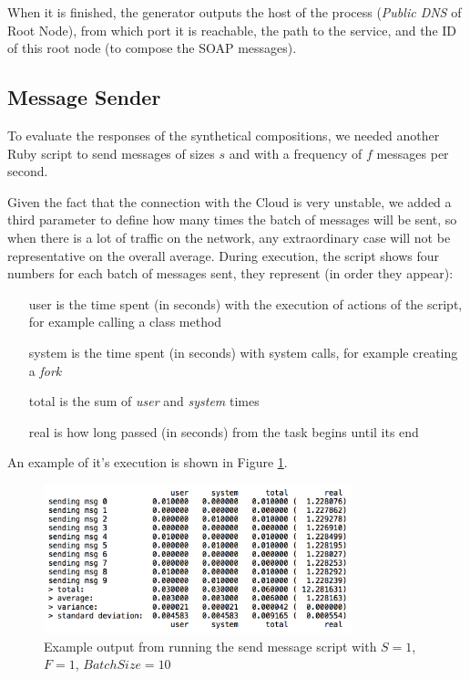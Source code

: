 When it is finished, the generator outputs the host of the process (\emph{Public DNS} of Root Node), from which port it is reachable, the path to the service, and the ID of this root node (to compose the SOAP messages).

\subsection{Message Sender}

To evaluate the responses of the synthetical compositions, we needed another Ruby script to send messages of sizes $s$ and with a frequency of $f$ messages per second.

Given the fact that the connection with the Cloud is very unstable, we added a third parameter to define how many times the batch of messages will be sent, so when there is a lot of traffic on the network, any extraordinary case will not be representative on the overall average. During execution, the script shows four numbers for each batch of messages sent, they represent (in order they appear):
\begin{itemize} 
	\item[user] is the time spent (in seconds) with the execution of actions of the script, for example calling a class method
	\item[system] is the time spent (in seconds) with system calls, for example creating a \emph{fork}
	\item[total] is the sum of \emph{user} and \emph{system} times
	\item[real] is how long passed (in seconds) from the task begins until its end
\end{itemize}

An example of it's execution is shown in Figure \ref{send-msg-output}.


\begin{figure}[htb]
	\centering
	\includegraphics[width=0.8\textwidth]{images/send-msg-output}
	\caption{Example output from running the send message script with $S = 1$, $F = 1$, $BatchSize = 10$}
	\label{send-msg-output}
\end{figure}
